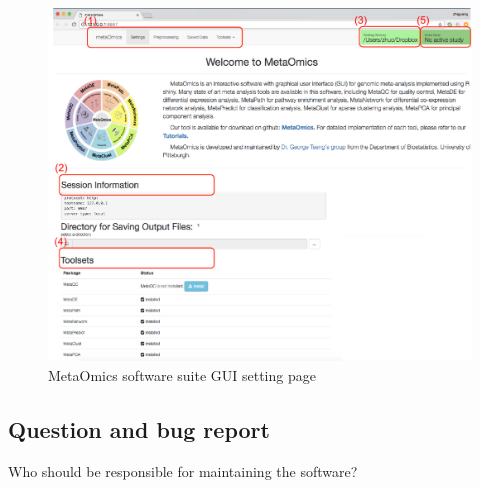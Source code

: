 \begin{figure}[H]
\begin{center}
\includegraphics[scale=1]{./figure/preprocessing/GUIsetting}
\caption{MetaOmics software suite GUI setting page}
\label{fig:GUIsetting}
\end{center}
\end{figure}


\subsection{Question and bug report}
{
\color{red}
Who should be responsible for maintaining the software?
}

 

